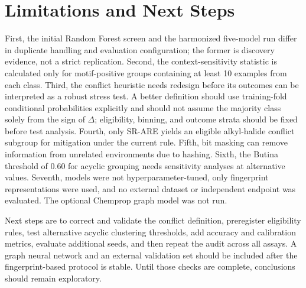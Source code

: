 \documentclass[conference]{IEEEtran}
\begin{document}
\section{Limitations and Next Steps}
First, the initial Random Forest screen and the harmonized five-model run differ in duplicate handling and evaluation configuration; the former is discovery evidence, not a strict replication. Second, the context-sensitivity statistic is calculated only for motif-positive groups containing at least 10 examples from each class. Third, the conflict heuristic needs redesign before its outcomes can be interpreted as a robust stress test. A better definition should use training-fold conditional probabilities explicitly and should not assume the majority class solely from the sign of $\Delta$; eligibility, binning, and outcome strata should be fixed before test analysis. Fourth, only SR-ARE yields an eligible alkyl-halide conflict subgroup for mitigation under the current rule. Fifth, bit masking can remove information from unrelated environments due to hashing. Sixth, the Butina threshold of 0.60 for acyclic grouping needs sensitivity analyses at alternative values. Seventh, models were not hyperparameter-tuned, only fingerprint representations were used, and no external dataset or independent endpoint was evaluated. The optional Chemprop graph model was not run.

Next steps are to correct and validate the conflict definition, preregister eligibility rules, test alternative acyclic clustering thresholds, add accuracy and calibration metrics, evaluate additional seeds, and then repeat the audit across all assays. A graph neural network and an external validation set should be included after the fingerprint-based protocol is stable. Until those checks are complete, conclusions should remain exploratory.
\end{document}
